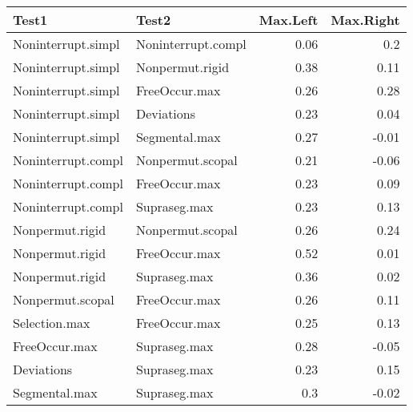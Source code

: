 \begin{table}
\centering
\begin{tabular}{llrr}
\toprule
Test1 & Test2 & Max.Left & Max.Right\\
\midrule
Noninterrupt.simpl & Noninterrupt.compl & 0.06 & \cellcolor{red!25}0.2\\
Noninterrupt.simpl & Nonpermut.rigid & \cellcolor{red!45}0.38 & 0.11\\
Noninterrupt.simpl & FreeOccur.max & \cellcolor{red!25}0.26 & \cellcolor{red!25}0.28\\
Noninterrupt.simpl & Deviations & \cellcolor{red!25}0.23 & 0.04\\
Noninterrupt.simpl & Segmental.max & \cellcolor{red!25}0.27 & -0.01\\
Noninterrupt.compl & Nonpermut.scopal & \cellcolor{red!25}0.21 & -0.06\\
Noninterrupt.compl & FreeOccur.max & \cellcolor{red!25}0.23 & 0.09\\
Noninterrupt.compl & Supraseg.max & \cellcolor{red!25}0.23 & 0.13\\
Nonpermut.rigid & Nonpermut.scopal & \cellcolor{red!25}0.26 & \cellcolor{red!25}0.24\\
Nonpermut.rigid & FreeOccur.max & \cellcolor{red!45}0.52 & 0.01\\
Nonpermut.rigid & Supraseg.max & \cellcolor{red!45}0.36 & 0.02\\
Nonpermut.scopal & FreeOccur.max & \cellcolor{red!25}0.26 & 0.11\\
Selection.max & FreeOccur.max & \cellcolor{red!25}0.25 & 0.13\\
FreeOccur.max & Supraseg.max & \cellcolor{red!25}0.28 & -0.05\\
Deviations & Supraseg.max & \cellcolor{red!25}0.23 & 0.15\\
Segmental.max & Supraseg.max & \cellcolor{red!25}0.3 & -0.02\\
\bottomrule
\end{tabular}
\end{table}

